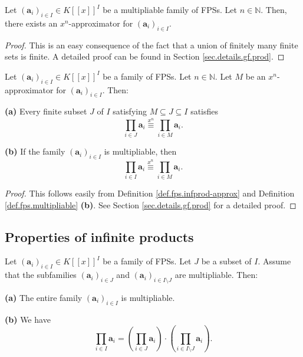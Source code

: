\begin{lemma}
\label{lem.fps.mulable.approx}
\leantarget
\leanok
Let $\left(\mathbf{a}_{i}\right)_{i\in I}\in K\left[\left[x\right]\right]^{I}$
be a multipliable family of FPSs. Let $n\in\mathbb{N}$. Then, there exists an
$x^{n}$-approximator for $\left(\mathbf{a}_{i}\right)_{i\in I}$.
\end{lemma}

\begin{proof}
\leanok
This is an easy consequence of the fact that a union of finitely many finite
sets is finite. A detailed proof can be found in Section
\ref{sec.details.gf.prod}.
\end{proof}

\begin{proposition}
\label{prop.fps.infprod-approx-xneq}
\leantarget
\leanok
Let $\left(\mathbf{a}_{i}\right)_{i\in I}\in K\left[\left[x\right]\right]^{I}$
be a family of FPSs. Let $n\in\mathbb{N}$. Let $M$ be an $x^{n}$-approximator
for $\left(\mathbf{a}_{i}\right)_{i\in I}$. Then:

\textbf{(a)} Every finite subset $J$ of $I$ satisfying $M\subseteq J\subseteq I$
satisfies
\[
\prod_{i\in J}\mathbf{a}_{i}\overset{x^{n}}{\equiv}\prod_{i\in M}\mathbf{a}_{i}.
\]

\textbf{(b)} If the family $\left(\mathbf{a}_{i}\right)_{i\in I}$ is
multipliable, then
\[
\prod_{i\in I}\mathbf{a}_{i}\overset{x^{n}}{\equiv}\prod_{i\in M}\mathbf{a}_{i}.
\]
\end{proposition}

\begin{proof}
This follows easily from Definition \ref{def.fps.infprod-approx} and
Definition \ref{def.fps.multipliable} \textbf{(b)}. See Section
\ref{sec.details.gf.prod} for a detailed proof.
\end{proof}

\subsection{Properties of infinite products}

\begin{proposition}
\label{prop.fps.union-mulable}
\leantarget
\leanok
Let $\left(\mathbf{a}_{i}\right)_{i\in I}\in K\left[\left[x\right]\right]^{I}$
be a family of FPSs. Let $J$ be a subset of $I$. Assume that the subfamilies
$\left(\mathbf{a}_{i}\right)_{i\in J}$ and
$\left(\mathbf{a}_{i}\right)_{i\in I\setminus J}$ are multipliable. Then:

\textbf{(a)} The entire family $\left(\mathbf{a}_{i}\right)_{i\in I}$ is
multipliable.

\textbf{(b)} We have
\[
\prod_{i\in I}\mathbf{a}_{i}=\left(\prod_{i\in J}\mathbf{a}_{i}\right)
\cdot\left(\prod_{i\in I\setminus J}\mathbf{a}_{i}\right).
\]
\end{proposition}

